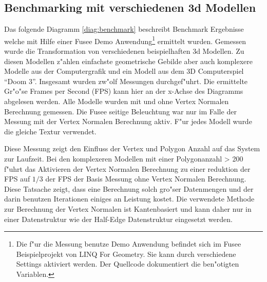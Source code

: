 \documentclass[pagesize, paper=a4, fontsize=12pt,titlepage=true, headings=small, headnosepline, abstractoff, liststotoc, nochapterprefix, plainheadsepline]{scrreprt}
\newcommand{\LFG}{LINQ For Geometry}
\newcommand{\HES}{Half-Edge Datenstruktur }
\begin{document}
\subsection{Benchmarking mit verschiedenen 3d Modellen}
Das folgende Diagramm \ref{diag:benchmark} beschreibt Benchmark Ergebnisse welche mit Hilfe einer Fusee Demo Anwendung\footnote{Die f"ur die Messung benutze Demo Anwendung befindet sich im Fusee Beispielprojekt von \LFG. Sie kann durch verschiedene Settings aktiviert werden. Der Quellcode dokumentiert die ben"otigten Variablen.} ermittelt wurden. Gemessen wurde die Transformation von verschiedenen beispielhaften 3d Modellen. Zu diesen Modellen z"ahlen einfachste geometrische Gebilde aber auch komplexere Modelle aus der Computergrafik und ein Modell aus dem 3D Computerspiel "`Doom 3"'. Insgesamt wurden zw"olf Messungen durchgef"uhrt. Die ermittelte Gr"o"se Frames per Second (FPS) kann hier an der x-Achse des Diagramms abgelesen werden. Alle Modelle wurden mit und ohne Vertex Normalen Berechnung gemessen. Die Fusee seitige Beleuchtung war nur im Falle der Messung mit der Vertex Normalen Berechnung aktiv. F"ur jedes Modell wurde die gleiche Textur verwendet.
\newline

Diese Messung zeigt den Einfluss der Vertex und Polygon Anzahl auf das System zur Laufzeit. Bei den komplexeren Modellen mit einer Polygonanzahl > 200 f"uhrt das Aktivieren der Vertex Normalen Berechnung zu einer reduktion der FPS auf $1/3$ der FPS der Basis Messung ohne Vertex Normalen Berechnung. Diese Tatsache zeigt, dass eine Berechnung solch gro"ser Datenmengen und der darin benutzen Iterationen einiges an Leistung kostet. Die verwendete Methode zur Berechnung der Vertex Normalen ist Kantenbasiert und kann daher nur in einer Datenstruktur wie der \HES eingesetzt werden.

 \label{diag:benchmark}


\end{document}
